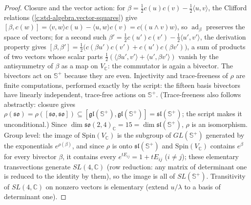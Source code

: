 \documentclass[11pt]{article}
\theoremstyle{definition}
\theoremstyle{plain}
\providecommand{\C}{}\renewcommand{\C}{\mathbb{C}}
\providecommand{\CS}{}\renewcommand{\CS}{{\mathbb{S}^{+}}}
\providecommand{\ip}{}\renewcommand{\ip}[2]{\langle #1, #2\rangle}
\begin{document}
\begin{proof}
Closure and the vector action: for $\beta = \tfrac12 c(u)c(v) - \tfrac12\ip{u}{v}$, the Clifford relations (\ref{c:std-algebra.vector-squares}) give $[\beta, c(w)] = \ip{v}{w}c(u) - \ip{u}{w}c(v) = c\bigl((u\wedge v)w\bigr)$, so $\operatorname{ad}_\beta$ preserves the space of vectors; for a second such $\beta'= \tfrac12 c(u')c(v') - \tfrac12\ip{u'}{v'}$, the derivation property gives $[\beta, \beta'] = \tfrac12\bigl(c(\beta u')c(v') + c(u')c(\beta v')\bigr)$, a sum of products of two vectors whose scalar parts $\tfrac12(\ip{\beta u'}{v'} + \ip{u'}{\beta v'})$ vanish by the antisymmetry of $\beta$ as a map on $V_\C$: the commutator is again a bivector. The bivectors act on $\CS$ because they are even. Injectivity and trace-freeness of $\rho$ are finite computations, performed exactly by the script: the fifteen basis bivectors have linearly independent, trace-free actions on $\CS$. (Trace-freeness also follows abstractly: closure gives $\rho(\mathfrak{so}) = \rho([\mathfrak{so},\mathfrak{so}]) \subseteq [\mathfrak{gl}(\CS), \mathfrak{gl}(\CS)] = \mathfrak{sl}(\CS)$; the script makes it unconditional.) Since $\dim \mathfrak{so}(2,4)_\C = 15 = \dim\mathfrak{sl}(\CS)$, $\rho$ is an isomorphism. Group level: the image of $\mathrm{Spin}(V_\C)$ is the subgroup of $GL(\CS)$ generated by the exponentials $e^{\rho(\beta)}$, and since $\rho$ is onto $\mathfrak{sl}(\CS)$ and $\mathrm{Spin}(V_\C)$ contains $e^{\beta}$ for every bivector $\beta$, it contains every $e^{tE_{ij}} = 1 + tE_{ij}$ ($i \neq j$); these elementary transvections generate $SL(4,\C)$ (row reduction: any matrix of determinant one is reduced to the identity by them), so the image is all of $SL(\CS)$. Transitivity of $SL(4,\C)$ on nonzero vectors is elementary (extend $u/\lambda$ to a basis of determinant one).

\end{proof}
\end{document}
